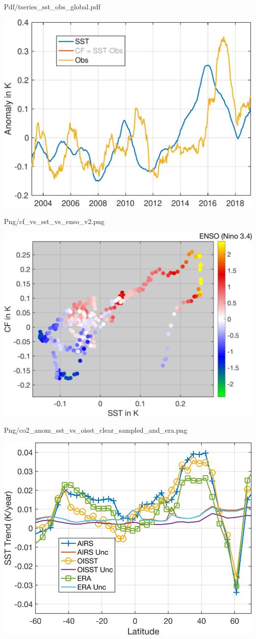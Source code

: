 \documentclass[presentation]{beamer}
\begin{document}
\begin{frame}[label={sec:orga558808}]{Pdf/tseries\_sst\_obs\_global.pdf}
\begin{center}
\includegraphics[width=0.7\linewidth]{./Figs/Pdf/tseries_sst_obs_global.pdf}
\end{center}
\end{frame}

\begin{frame}[label={sec:org352c195}]{Png/cf\_vs\_sst\_vs\_enso\_v2.png}
\begin{center}
\includegraphics[width=0.7\linewidth]{./Figs/Png/cf_vs_sst_vs_enso_v2.png}
\end{center}
\end{frame}

\begin{frame}[label={sec:orgb25d076}]{Png/co2\_anom\_sst\_vs\_oisst\_clear\_sampled\_and\_era.png}
\begin{center}
\includegraphics[width=0.7\linewidth]{./Figs/Png/co2_anom_sst_vs_oisst_clear_sampled_and_era.png}
\end{center}
\end{frame}
\end{document}
